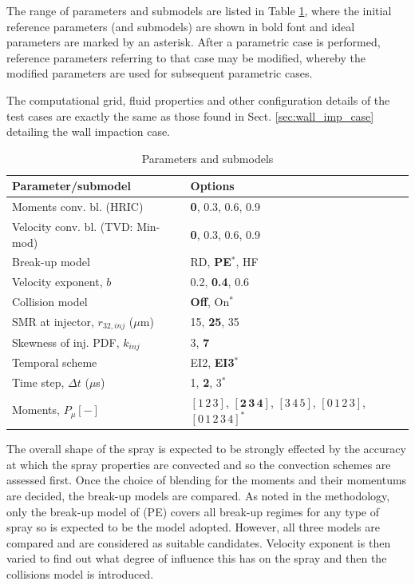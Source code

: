 \documentclass[a4paper,10pt]{article}
\begin{document}
The range of parameters and submodels are listed in Table \ref{tab:spr_param}, where the initial reference parameters (and submodels) are shown in bold font and ideal parameters are marked by an asterisk. After a parametric case is performed, reference parameters referring to that case may be modified, whereby the modified parameters are used for subsequent parametric cases.

The computational grid, fluid properties and other configuration details of the test cases are exactly the same as those found in Sect. \ref{sec:wall_imp_case} detailing the wall impaction case.
%
\begin{table}[H]
\caption{Parameters and submodels}
\vspace{2mm}
\centering
\begin{tabular}{l | l}
\hline \hline
Parameter/submodel & Options \\
\hline
Moments conv. bl. (HRIC) & \textbf{0}, 0.3, 0.6, 0.9 \\
Velocity conv. bl. (TVD: Min-mod) & \textbf{0}, 0.3, 0.6, 0.9 \\
\hline
Break-up model & RD, \textbf{PE}$^{\ast}$, HF \\
Velocity exponent, $b$ & 0.2, \textbf{0.4}, 0.6 \\
Collision model & \textbf{Off}, On$^{\ast}$ \\
\hline
SMR at injector, $r_{32,inj}$ ($\mu$m) & 15, \textbf{25}, 35 \\
Skewness of inj. PDF, $k_{inj}$ & 3, \textbf{7} \\
\hline
Temporal scheme & EI2, \textbf{EI3}$^{\ast}$ \\
Time step, $\Delta t$ ($\mu$s) & 1, \textbf{2}, 3$^{\ast}$ \\
\hline
Moments, $P_{\mu}[-]$ & $[1\,2\,3]$, $\mathbf{[2\,3\,4]}$, $[3\,4\,5]$, $[0\,1\,2\,3]$, ${[0\,1\,2\,3\,4]}^{\ast}$ \\
\end{tabular}
\label{tab:spr_param}
\end{table}

The overall shape of the spray is expected to be strongly effected by the accuracy at which the spray properties are convected and so the convection schemes are assessed first. Once the choice of blending for the moments and their momentums are decided, the break-up models are compared. As noted in the methodology, only the break-up model of \cite{pilch1987} (PE) covers all break-up regimes for any type of spray so is expected to be the model adopted. However, all three models are compared and are considered as suitable candidates. Velocity exponent is then varied to find out what degree of influence this has on the spray and then the collisions model is introduced.
\end{document}
